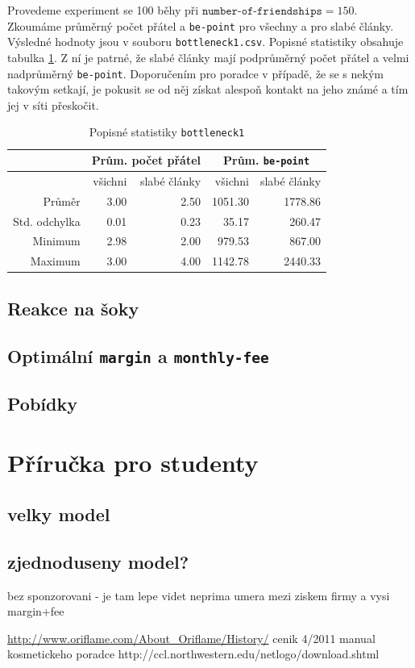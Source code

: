 \documentclass[a4wide,12pt]{report}
\begin{document}
Provedeme experiment se 100 běhy při $\texttt{number-of-friendships}=150$. Zkoumáme průměrný počet přátel a \texttt{be-point} pro všechny a pro slabé články. Výsledné hodnoty jsou v souboru \texttt{bottleneck1.csv}. Popisné statistiky obsahuje tabulka \ref{tab:bottleneck1_desc}. Z ní je patrné, že slabé články mají podprůměrný počet přátel a velmi nadprůměrný \texttt{be-point}. Doporučením pro poradce v případě, že se s nekým takovým setkají, je pokusit se od něj získat alespoň kontakt na jeho známé a tím jej v síti přeskočit.
\begin{table}[h]
  \begin{center}
  \begin{tabular}{|r|r|r|r|r|}
  \hline
   & \multicolumn{2}{|c|}{Prům. počet přátel} & \multicolumn{2}{|c|}{Prům. \texttt{be-point}} \\\hline
	  &všichni	&slabé články	&všichni	&slabé články\\\hline
  Průměr	&3.00	&2.50	&1051.30	&1778.86\\
  Std. odchylka	&0.01	&0.23	&35.17	&260.47\\
  Minimum	&2.98	&2.00	&979.53	&867.00\\
  Maximum	&3.00	&4.00	&1142.78	&2440.33\\\hline
  \end{tabular}
  \end{center}
  \caption{Popisné statistiky \texttt{bottleneck1}}
  \label{tab:bottleneck1_desc}
\end{table}
\section{Reakce na šoky}
\section{Optimální \texttt{margin} a \texttt{monthly-fee}}
\section{Pobídky}
\chapter*{Příručka pro studenty}
\section{velky model}
\section{zjednoduseny model?}
bez sponzorovani - je tam lepe videt neprima umera mezi ziskem firmy a vysi margin+fee
\begin{thebibliography}{9}


\end{thebibliography}
\url{http://www.oriflame.com/About_Oriflame/History/}
cenik 4/2011
manual kosmetickeho poradce
http://ccl.northwestern.edu/netlogo/download.shtml
\end{document}
